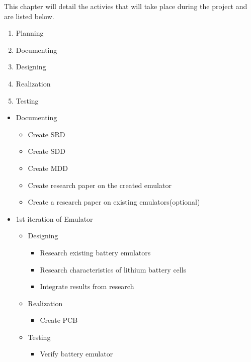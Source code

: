 This chapter will detail the activies that will take place during the project and are listed below. 

\begin{enumerate}
    \item Planning 
    \item Documenting
    \item Designing 
    \item Realization
    \item Testing
\end{enumerate}


\begin{itemize}
    \item Documenting
    \begin{itemize}
    \item Create SRD
    \item Create SDD
    \item Create MDD
    \item Create research paper on the created emulator 
    \item Create a research paper on existing emulators(optional)
    \end{itemize}

    \item 1st iteration of Emulator
    \begin{itemize}
        \item Designing
        \begin{itemize}
            \item Research existing battery emulators 
            \item Research characteristics of lithium battery cells 
            \item Integrate results from research
        \end{itemize}
        \item Realization
        \begin{itemize}
            \item Create PCB
        \end{itemize}
        \item Testing
        \begin{itemize}
            \item Verify battery emulator
        \end{itemize}
    \end{itemize}


\end{itemize}
